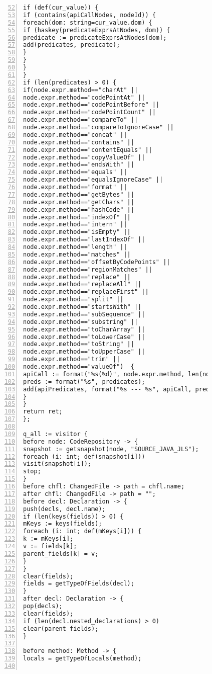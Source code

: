 \begin{figure}[ht!]
\begin{lstlisting}[numbers=left, tabsize=4, escapechar=@, caption={API Precondition Mining Analysis},label={lst:apm-code}, firstline = 52, firstnumber = 52, lastline = 112]
if (def(cur_value)) {
if (contains(apiCallNodes, nodeId)) {
foreach(dom: string=cur_value.dom) {
if (haskey(predicateExprsAtNodes, dom)) {
predicate := predicateExprsAtNodes[dom];
add(predicates, predicate);
}
}
}
}
if (len(predicates) > 0) {
if(node.expr.method=="charAt" ||  
node.expr.method=="codePointAt" || 
node.expr.method=="codePointBefore" || 
node.expr.method=="codePointCount" || 
node.expr.method=="compareTo" || 
node.expr.method=="compareToIgnoreCase" || 
node.expr.method=="concat" || 
node.expr.method=="contains" || 
node.expr.method=="contentEquals" || 
node.expr.method=="copyValueOf" || 
node.expr.method=="endsWith" || 
node.expr.method=="equals" || 
node.expr.method=="equalsIgnoreCase" || 
node.expr.method=="format" || 
node.expr.method=="getBytes" || 
node.expr.method=="getChars" || 
node.expr.method=="hashCode" || 
node.expr.method=="indexOf" || 
node.expr.method=="intern" || 
node.expr.method=="isEmpty" || 
node.expr.method=="lastIndexOf" || 
node.expr.method=="length" || 
node.expr.method=="matches" || 
node.expr.method=="offsetByCodePoints" || 
node.expr.method=="regionMatches" || 
node.expr.method=="replace" || 
node.expr.method=="replaceAll" || 
node.expr.method=="replaceFirst" || 
node.expr.method=="split" ||  
node.expr.method=="startsWith" ||  
node.expr.method=="subSequence" || 
node.expr.method=="substring" || 
node.expr.method=="toCharArray" || 
node.expr.method=="toLowerCase" || 
node.expr.method=="toString" || 
node.expr.method=="toUpperCase" || 
node.expr.method=="trim" || 
node.expr.method=="valueOf")  {
apiCall := format("%s(%d)", node.expr.method, len(node.expr.method_args));
preds := format("%s", predicates);
add(apiPredicates, format("%s --- %s", apiCall, preds));
}
}
return ret;
};

q_all := visitor {
before node: CodeRepository -> {
snapshot := getsnapshot(node, "SOURCE_JAVA_JLS");
foreach (i: int; def(snapshot[i]))
visit(snapshot[i]);
stop;
}
before chfl: ChangedFile -> path = chfl.name;
after chfl: ChangedFile -> path = "";
before decl: Declaration -> {
push(decls, decl.name);
if (len(keys(fields)) > 0) {
mKeys := keys(fields);    
foreach (i: int; def(mKeys[i])) {
k := mKeys[i];
v := fields[k];
parent_fields[k] = v;
}
}
clear(fields);
fields = getTypeOfFields(decl);
}
after decl: Declaration -> {
pop(decls);
clear(fields);
if (len(decl.nested_declarations) > 0)
clear(parent_fields);
}

before method: Method -> {
locals = getTypeOfLocals(method);


\end{lstlisting}
\end{figure}
